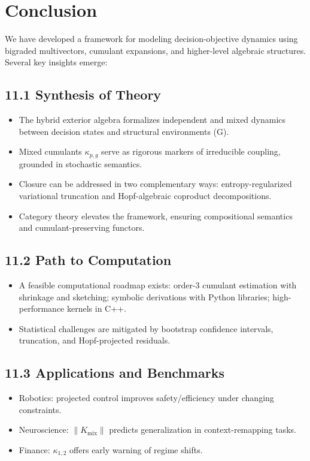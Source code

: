 \section{Conclusion}\label{sec:conclusion1}

We have developed a framework for modeling decision-objective dynamics using bigraded multivectors, cumulant expansions, and higher-level algebraic structures. Several key insights emerge:

\subsection*{11.1 \quad Synthesis of Theory}
\begin{itemize}
    \item The hybrid exterior algebra formalizes independent and mixed dynamics between decision states and structural environments (G).
    \item Mixed cumulants $\kappa_{p,g}$ serve as rigorous markers of irreducible coupling, grounded in stochastic semantics.
    \item Closure can be addressed in two complementary ways: entropy-regularized variational truncation and Hopf-algebraic coproduct decompositions.
    \item Category theory elevates the framework, ensuring compositional semantics and cumulant-preserving functors.
\end{itemize}

\subsection*{11.2 \quad Path to Computation}
\begin{itemize}
    \item A feasible computational roadmap exists: order-3 cumulant estimation with shrinkage and sketching; symbolic derivations with Python libraries; high-performance kernels in C++.
    \item Statistical challenges are mitigated by bootstrap confidence intervals, truncation, and Hopf-projected residuals.
\end{itemize}

\subsection*{11.3 \quad Applications and Benchmarks}
\begin{itemize}
    \item Robotics: projected control improves safety/efficiency under changing constraints.
    \item Neuroscience: $\|K_{\text{mix}}\|$ predicts generalization in context-remapping tasks.
    \item Finance: $\kappa_{1,2}$ offers early warning of regime shifts.
\end{itemize}

